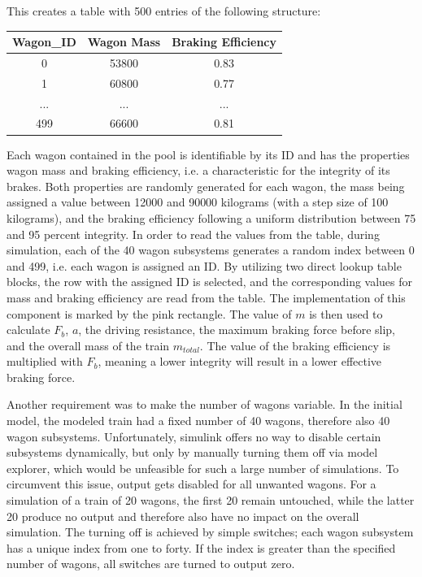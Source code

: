 \noindent
This creates a table with 500 entries of the following structure:

\bigskip
\begin{tabular}{c|c|c}
	Wagon\_ID & Wagon Mass & Braking Efficiency \\
	\hline
	0 & 53800 & 0.83 \\
	\hline
	1 & 60800 & 0.77 \\
	\hline
	... & ... & ... \\
	\hline
	499 & 66600 & 0.81 \\
\end{tabular}
\bigskip

Each wagon contained in the pool is identifiable by its ID and has the properties wagon mass and braking efficiency, i.e. a characteristic for the integrity of its brakes. Both properties are randomly generated for each wagon, the mass being assigned a value between 12000 and 90000 kilograms (with a step size of 100 kilograms), and the braking efficiency following a uniform distribution between 75 and 95 percent integrity. In order to read the values from the table, during simulation, each of the 40 wagon subsystems generates a random index between 0 and 499, i.e. each wagon is assigned an ID. By utilizing two direct lookup table blocks, the row with the assigned ID is selected, and the corresponding values for mass and braking efficiency are read from the table. The implementation of this component is marked by the pink rectangle. The value of $m$ is then used to calculate $F_{b}$, $a$, the driving resistance, the maximum braking force before slip, and the overall mass of the train $m_{total}$. The value of the braking efficiency is multiplied with $F_{b}$, meaning a lower integrity will result in a lower effective braking force.

\par
Another requirement was to make the number of wagons variable. In the initial model, the modeled train had a fixed number of 40 wagons, therefore also 40 wagon subsystems. Unfortunately, simulink offers no way to disable certain subsystems dynamically, but only by manually turning them off via model explorer, which would be unfeasible for such a large number of simulations. To circumvent this issue, output gets disabled for all unwanted wagons. For a simulation of a train of 20 wagons, the first 20 remain untouched, while the latter 20 produce no output and therefore also have no impact on the overall simulation. The turning off is achieved by simple switches; each wagon subsystem has a unique index from one to forty. If the index is greater than the specified number of wagons, all switches are turned to output zero.
	
